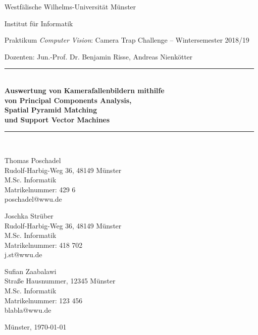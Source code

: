 \begin{titlepage}
	\newcommand{\HRule}{\rule{\linewidth}{0.8mm}}
	
	Westfälische Wilhelms-Universität Münster
	
	Institut für Informatik
	
	Praktikum \textit{Computer Vision}: Camera Trap Challenge -- Wintersemester 2018/19 
	
	Dozenten: Jun.-Prof. Dr. Benjamin Risse, Andreas Nienkötter

	\center
 
 	
	
	\HRule \\[0.5cm]
	{ \huge \sffamily\bfseries Auswertung von Kamerafallenbildern mithilfe \\ von Principal Components Analysis, \\ Spatial Pyramid Matching \\ und Support Vector Machines\\[0.4cm]}
	\HRule \\[0.5cm]
	
	
	\vfill
	\flushright
	
	Thomas Poschadel \\
	Rudolf-Harbig-Weg 36, 48149 Münster \\
	M.Sc. Informatik \\
	Matrikelnummer: 429 6 \\
	poschadel@wwu.de \\
	
	\vspace{2em}
	
	Joschka Strüber \\
	Rudolf-Harbig-Weg 36, 48149 Münster \\
	M.Sc. Informatik \\
	Matrikelnummer: 418 702 \\
	j.st@wwu.de \\
	
	\vspace{2em}
	
	Sufian Zaabalawi \\
	Straße Hausnummer, 12345 Münster \\
	M.Sc. Informatik \\
	Matrikelnummer: 123 456 \\
	blabla@wwu.de \\
	
	\vspace{2em}
	
	Münster, \today
	
	\restoregeometry
\end{titlepage}